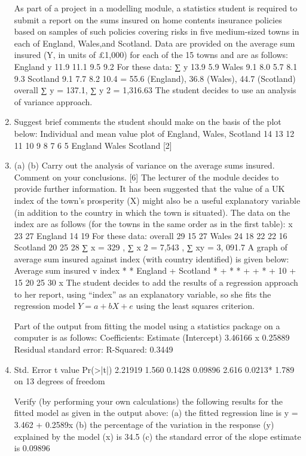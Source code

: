 \documentclass[a4paper,12pt]{article}
\begin{document}
\begin{enumerate}As part of a project in a modelling module, a statistics student is required to submit a
report on the sums insured on home contents insurance policies based on samples of such policies covering risks in five medium-sized towns in each of England, Wales,and Scotland. Data are provided on the average sum insured (Y, in units of £1,000)
for each of the 15 towns and are as follows:
England
y 11.9 11.1 9.5 9.2
For these data:
∑ y
13.9
5.9
Wales
9.1 8.0 5.7
8.1
9.3
Scotland
9.1 7.7 8.2
10.4
= 55.6 (England), 36.8 (Wales), 44.7 (Scotland)
overall
∑ y = 137.1, ∑ y 2
= 1,316.63
The student decides to use an analysis of variance approach.
\item 
Suggest brief comments the student should make on the basis of the plot
below:
Individual and mean value plot of England, Wales, Scotland
14
13
12
11
10
9
8
7
6
5
England
Wales
Scotland
[2]
\item 
(a)
(b)
Carry out the analysis of variance on the average sums insured.
Comment on your conclusions.
[6]
The lecturer of the module decides to provide further information. It has been suggested that the value of a UK index of the town’s prosperity (X) might also be a useful explanatory variable (in addition to the country in which the town is situated).
The data on the index are as follows (for the towns in the same order as in the first
table):
x
23
27
England
14 19
For these data: overall
29
15
27
Wales
24 18
22
22
16
Scotland
20 25
28
∑ x = 329 , ∑ x 2 = 7,543 , ∑ xy = 3, 091.7
A graph of average sum insured against index (with country identified) is given
below:
Average sum insured v index
*
* England
+ Scotland
*
+
*
*
+
+
*
%
+
%
10
%
+
%
%
15
20
25
30
x
The student decides to add the results of a regression approach to her report, using “index” as an explanatory variable, so she fits the regression model
$Y = a + bX + e$
using the least squares criterion.


Part of the output from fitting the model using a statistics package on a computer is as follows:
Coefficients: Estimate
(Intercept) 3.46166
x
0.25889
Residual standard error:
R-Squared: 0.3449
\item 
Std. Error t value Pr(>|t|)
2.21919
1.560 0.1428
0.09896
2.616 0.0213*
1.789 on 13 degrees of freedom


Verify (by performing your own calculations) the following results for the fitted model as given in the output above:
(a) the fitted regression line is y = 3.462 + 0.2589x
(b) the percentage of the variation in the response (y) explained by the model (x) is 34.5%
(c) the standard error of the slope estimate is 0.09896


\end{enumerate}
\end{document}
